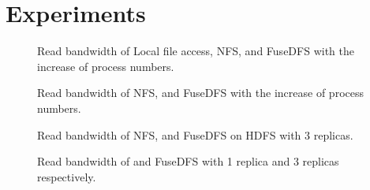 \section{Experiments}
\label{sec:exp}

\begin{figure}[t]
\begin{minipage}{3in}
\begin{center}
\caption{\small Read bandwidth of Local file access, NFS, {\proj} and FuseDFS
with the increase of process numbers.}
\label{fig:read1}
\vspace{-6pt}
\end{center}
\end{minipage}
\hspace{0.02in}
\begin{minipage}{3in}
\begin{center}
\caption{\small Read bandwidth of NFS, {\proj} and FuseDFS
with the increase of process numbers.}
\label{fig:read2}
\vspace{-6pt}
\end{center}
\end{minipage}
\end{figure}

\begin{figure}[t]
\begin{minipage}{3in}
\begin{center}
\caption{\small Read bandwidth of NFS, {\proj} and FuseDFS on HDFS with 3
replicas.}
\label{fig:read3}
\vspace{-6pt}
\end{center}
\end{minipage}
\hspace{0.02in}
\begin{minipage}{3in}
\begin{center}
\caption{\small Read bandwidth of {\proj} and FuseDFS
with 1 replica and 3 replicas respectively.}
\label{fig:read4}
\vspace{-6pt}
\end{center}
\end{minipage}
\end{figure}

